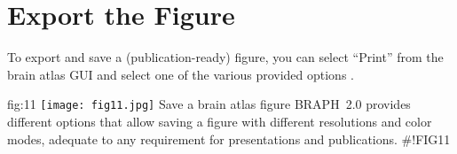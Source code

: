 \documentclass[justified]{tufte-handout}
\begin{document}
\clearpage
\section{Export the Figure}

To export and save a (publication-ready) figure, you can select ``Print'' from the brain atlas GUI and select one of the various provided options .

	{fig:11}
	{\texttt{[image: fig11.jpg]}}
	{Save a brain atlas figure}
	{
	BRAPH~2.0 provides different options that allow saving a figure with different resolutions and color modes, adequate to any requirement for presentations and publications.
	}
#!FIG11
\end{document}
